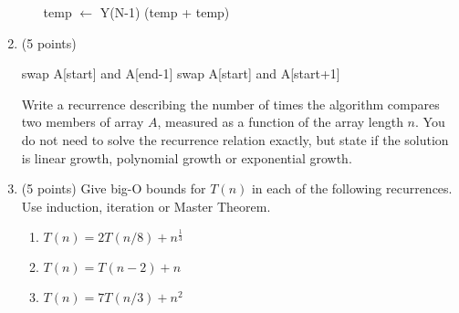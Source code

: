\documentclass[1]{cs430homework}
\begin{document}
\begin{enumerate}[label=\arabic*.]
\begin{enumerate}[label=\arabic{enumi}\alph*)]
\begin{algorithm}[H]
\begin{algorithmic}[1]
				\Else{}
					\State temp $\gets$ Y(N-1)
					\State \Return (temp + temp)
				\EndIf
			\EndFunction
			\end{algorithmic}
		\end{algorithm}
	\end{enumerate}
	\item (5 points)
		\begin{algorithm}[H]
			\label{alg:7a}  %
			\begin{algorithmic}[1]
					\Return
				\EndIf
					\State swap A[start] and A[end-1]
				\EndIf
				\State {}
					\State swap A[start] and A[start+1]
				\EndIf
				\State {}
			\EndFunction
			\end{algorithmic}
		\end{algorithm}
		Write a recurrence describing the number of times the algorithm compares two members of array $A$, measured as a function of the array length $n$. You do not need to solve the recurrence relation exactly, but state if the solution is linear growth, polynomial growth or exponential growth.
	\item (5 points) Give big-O bounds for $T(n)$ in each of the following recurrences. Use induction, iteration or Master Theorem.
	\begin{enumerate}[label=\arabic{enumi}\alph*)]
	    \item $T(n)=2T(n/8)+n^{\frac{1}{3}}$
	    \item $T(n)=T(n-2)+n$
	    \item $T(n)=7T(n/3)+n^{2}$
	\end{enumerate}
\end{enumerate}
\end{document}
